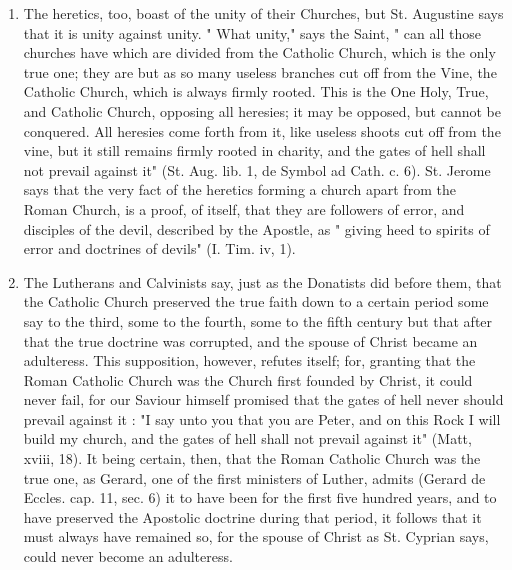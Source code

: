 \documentclass[12pt]{book}
\begin{document}
\begin{enumerate}
\item The heretics, too, boast of the unity of their Churches, but St. Augustine says that it is unity against
unity. " What unity," says the Saint, " can all those churches have which are divided from the Catholic
Church, which is the only true one; they are but as so many useless branches cut off from the Vine, the
Catholic Church, which is always firmly rooted. This is the One Holy, True, and Catholic Church,
opposing all heresies; it may be opposed, but cannot be conquered. All heresies come forth from it, like
useless shoots cut off from the vine, but it still remains firmly rooted in charity, and the gates of hell shall
not prevail against it" (St. Aug. lib. 1, de Symbol ad Cath. c. 6). St. Jerome says that the very fact of the
heretics forming a church apart from the Roman Church, is a proof, of itself, that they are followers of
error, and disciples of the devil, described by the Apostle, as " giving heed to spirits of error and doctrines
of devils" (I. Tim. iv, 1).

\item The Lutherans and Calvinists say, just as the Donatists did before them, that the Catholic Church
preserved the true faith down to a certain period some say to the third, some to the fourth, some to the
fifth century but that after that the true doctrine was corrupted, and the spouse of Christ became an
adulteress. This supposition, however, refutes itself; for, granting that the Roman Catholic Church was
the Church first founded by Christ, it could never fail, for our Saviour himself promised that the gates of
hell never should prevail against it : "I say unto you that you are Peter, and on this Rock I will build my
church, and the gates of hell shall not prevail against it" (Matt, xviii, 18). It being certain, then, that the
Roman Catholic Church was the true one, as Gerard, one of the first ministers of Luther, admits (Gerard
de Eccles. cap. 11, sec. 6) it to have been for the first five hundred years, and to have preserved the
Apostolic doctrine during that period, it follows that it must always have remained so, for the spouse of
Christ as St. Cyprian says, could never become an adulteress.


\end{enumerate}
\end{document}
